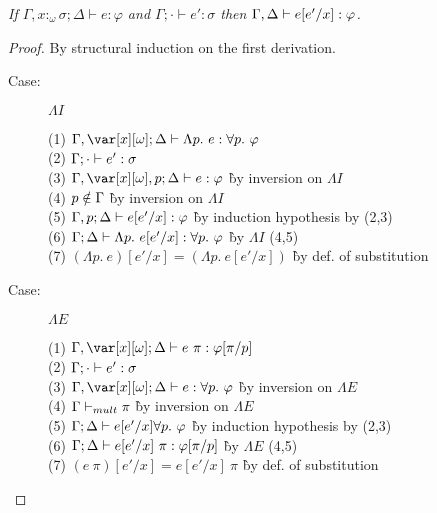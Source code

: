 

\begin{lemma}
\emph{If $\Gamma, x{:}_\omega\sigma; \Delta \vdash e : \varphi$ and $\Gamma; \cdot \vdash e' : \sigma$ then $\Gamma,\Delta \vdash e[e'/x] : \varphi$.}
\end{lemma}

\begin{proof}
By structural induction on the first derivation.

\begin{description}

\item[Case:] $\Lambda I$
\begin{tabbing}
  (1) $\G, \xo; \D \vdash \Lambda p.~e : \forall p.~\varphi$\\
  (2) $\Gamma; \cdot \vdash e' : \sigma$ \\
  (3) $\G, \xo, p; \D \vdash e : \varphi$ \` by inversion on $\Lambda I$\\
  (4) $p \notin \Gamma$ \` by inversion on $\Lambda I$\\
  (5) $\Gamma, p; \Delta \vdash e[e'/x] : \varphi$ \` by induction hypothesis by (2,3)\\
  (6) $\Gamma; \Delta \vdash \Lambda p.~e[e'/x] : \forall p.~\varphi$ \` by $\Lambda I$ (4,5)\\
  (7) $(\Lambda p.~e)[e'/x] = (\Lambda p.~e[e'/x])$ \` by def. of substitution\\
\end{tabbing}

\item[Case:] $\Lambda E$
\begin{tabbing}
  (1) $\G, \xo; \D \vdash e~\pi: \varphi[\pi/p]$\\
  (2) $\Gamma; \cdot \vdash e' : \sigma$\\
  (3) $\G, \xo; \D \vdash e : \forall p.~\varphi$ \` by inversion on $\Lambda E$\\
  (4) $\Gamma \vdash_{mult} \pi$ \` by inversion on $\Lambda E$\\
  (5) $\Gamma; \Delta \vdash e[e'/x] \forall p.~\varphi$ \` by induction hypothesis by (2,3)\\
  (6) $\Gamma; \Delta \vdash e[e'/x]~\pi : \varphi[\pi/p]$ \` by $\Lambda E$ (4,5)\\
  (7) $(e~\pi)[e'/x] = e[e'/x]~\pi$ \` by def. of substitution\\
\end{tabbing}


\end{description}
\end{proof}
